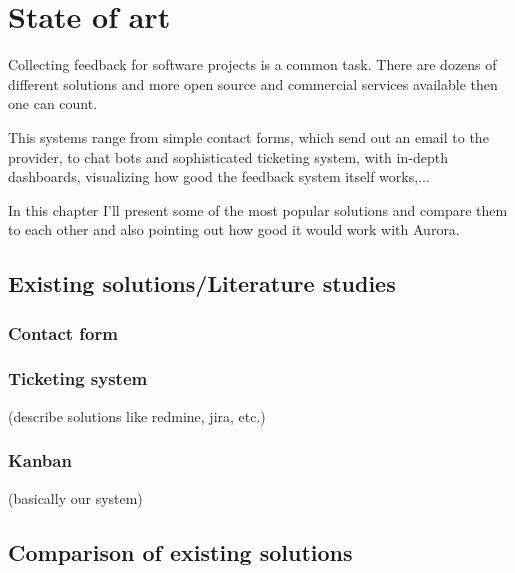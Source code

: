 \chapter{State of art}

Collecting feedback for software projects is a common task. There are dozens of different solutions and more open source and commercial services available then one can count.

This systems range from simple contact forms, which send out an email to the provider, to chat bots and sophisticated ticketing system, with in-depth dashboards, visualizing how good the feedback system itself works,... 

In this chapter I'll present some of the most popular solutions and compare them to each other and also pointing out how good it would work with Aurora.

\section{Existing solutions/Literature studies}


\subsection{Contact form} 

\subsection{Ticketing system}

(describe solutions like redmine, jira, etc.)

\subsection{Kanban}

(basically our system)

\section{Comparison of existing solutions}

